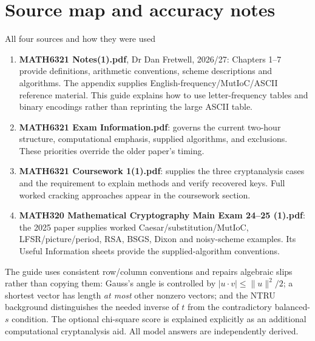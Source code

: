 \documentclass[11pt,a4paper]{article}
\begin{document}
\section{Source map and accuracy notes}
\begin{concept}{All four sources and how they were used}
\begin{enumerate}
\item \textbf{MATH6321 Notes(1).pdf}, Dr Dan Fretwell, 2026/27: Chapters 1--7 provide definitions, arithmetic conventions, scheme descriptions and algorithms. The appendix supplies English-frequency/MutIoC/ASCII reference material. This guide explains how to use letter-frequency tables and binary encodings rather than reprinting the large ASCII table.
\item \textbf{MATH6321 Exam Information.pdf}: governs the current two-hour structure, computational emphasis, supplied algorithms, and exclusions. These priorities override the older paper's timing.
\item \textbf{MATH6321 Coursework 1(1).pdf}: supplies the three cryptanalysis cases and the requirement to explain methods and verify recovered keys. Full worked cracking approaches appear in the coursework section.
\item \textbf{MATH320 Mathematical Cryptography Main Exam 24--25 (1).pdf}: the 2025 paper supplies worked Caesar/substitution/MutIoC, LFSR/picture/period, RSA, BSGS, Dixon and noisy-scheme examples. Its Useful Information sheets provide the supplied-algorithm conventions.
\end{enumerate}
The guide uses consistent row/column conventions and repairs algebraic slips rather than copying them: Gauss's angle is controlled by \(|u\cdot v|\le\|u\|^2/2\); a shortest vector has length \emph{at most} other nonzero vectors; and the NTRU background distinguishes the needed inverse of \(t\) from the contradictory balanced-\(s\) condition. The optional chi-square score is explained explicitly as an additional computational cryptanalysis aid. All model answers are independently derived.
\end{concept}
\end{document}
